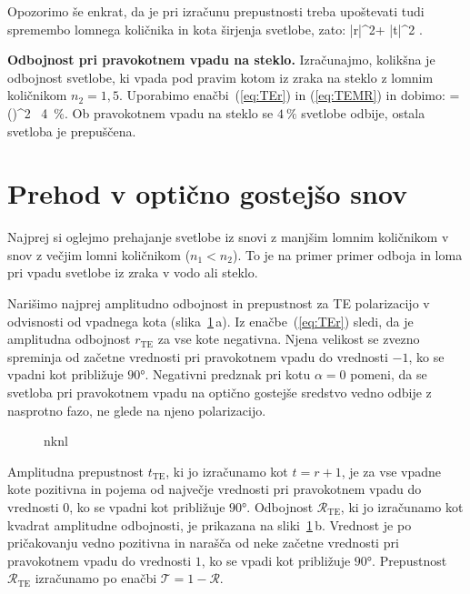 Opozorimo še enkrat, da je pri izračunu prepustnosti treba upoštevati tudi 
spremembo lomnega količnika in kota širjenja svetlobe, zato:
\beq
|r|^2+ |t|^2 .
\label{eq:04_48}
\eeq

\begin{example}{\bf Odbojnost pri pravokotnem vpadu na steklo.} 
Izračunajmo, kolikšna je odbojnost svetlobe, ki vpada pod pravim kotom iz zraka na
steklo z lomnim količnikom $n_2=1,5$. Uporabimo enačbi~(\ref{eq:TEr}) in (\ref{eq:TEMR})
in dobimo:
\beq
{} = \left(\right)^2 \approx~4~\%.
\label{eq:04_49}
\eeq
Ob pravokotnem vpadu na steklo se $4~\%$ svetlobe odbije, ostala 
svetloba je prepuščena.
\end{example}

\section{Prehod v optično gostejšo snov}
Najprej si oglejmo prehajanje svetlobe iz snovi z manjšim lomnim
količnikom v snov z večjim lomni količnikom ($n_1<n_2$). To je na primer
primer odboja in loma pri vpadu svetlobe iz zraka v vodo ali steklo. 

Narišimo najprej amplitudno odbojnost in prepustnost za TE polarizacijo v odvisnosti
od vpadnega kota (slika~\ref{fig:04_redte}\,a). 
Iz enačbe~(\ref{eq:TEr}) sledi, da je amplitudna odbojnost $r_\mathrm{TE}$
za vse kote negativna. Njena velikost se zvezno spreminja od začetne vrednosti
pri pravokotnem vpadu do vrednosti $-1$, ko se vpadni kot približuje $90\si{\degree}$.
Negativni predznak pri kotu $\alpha =0$ pomeni, da se svetloba pri 
pravokotnem vpadu na optično gostejše sredstvo vedno odbije z nasprotno fazo, ne 
glede na njeno polarizacijo.
\begin{figure}[ht]
\centering
\def\svgwidth{140truemm} 

\caption{nknl}
\label{fig:04_redte}
\end{figure}

Amplitudna prepustnost $t_\mathrm{TE}$, ki jo izračunamo kot $t=r+1$, je za vse
vpadne kote pozitivna in pojema od največje vrednosti pri pravokotnem vpadu
do vrednosti $0$, ko se vpadni kot približuje $90\si{\degree}$. 
Odbojnost $\mathcal{R}_\mathrm{TE}$, ki jo izračunamo kot kvadrat amplitudne odbojnosti,
je prikazana na sliki~\ref{fig:04_redte}\,b. Vrednost je po pričakovanju 
vedno pozitivna in narašča od neke začetne vrednosti pri pravokotnem
vpadu do vrednosti $1$, ko se vpadi kot približuje $90\si{\degree}$. Prepustnost
$\mathcal{R}_\mathrm{TE}$ izračunamo po enačbi $\mathcal{T} = 1 -\mathcal{R}$. 

